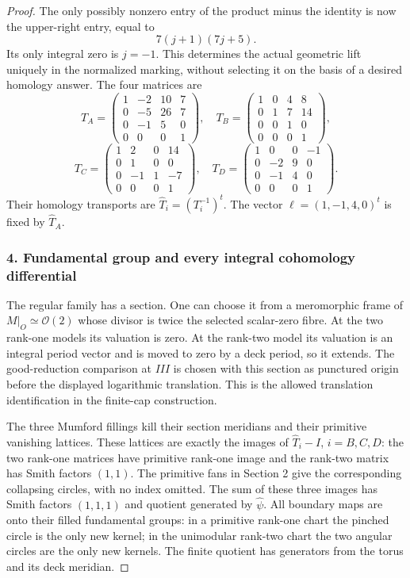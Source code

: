 \begin{proof}
The only possibly nonzero entry of the product minus the identity is now the upper-right entry, equal to \[
 7(j+1)(7j+5).
\] Its only integral zero is \(j=-1\). This determines the actual geometric lift uniquely in the normalized marking, without selecting it on the basis of a desired homology answer. The four matrices are \[
 T_A=\begin{pmatrix}1&-2&10&7\\0&-5&26&7\\0&-1&5&0\\0&0&0&1\end{pmatrix},\quad
 T_B=\begin{pmatrix}1&0&4&8\\0&1&7&14\\0&0&1&0\\0&0&0&1\end{pmatrix},
\] \[
 T_C=\begin{pmatrix}1&2&0&14\\0&1&0&0\\0&-1&1&-7\\0&0&0&1\end{pmatrix},\quad
 T_D=\begin{pmatrix}1&0&0&-1\\0&-2&9&0\\0&-1&4&0\\0&0&0&1\end{pmatrix}.
\] Their homology transports are \(\widehat T_i=(T_i^{-1})^t\). The vector \(\ell=(1,-1,4,0)^t\) is fixed by \(\widehat T_A\).

\subsubsection{4. Fundamental group and every integral cohomology differential}\label{fundamental-group-and-every-integral-cohomology-differential}

The regular family has a section. One can choose it from a meromorphic frame of \(M|_O\simeq\mathcal O(2)\) whose divisor is twice the selected scalar-zero fibre. At the two rank-one models its valuation is zero. At the rank-two model its valuation is an integral period vector and is moved to zero by a deck period, so it extends. The good-reduction comparison at \(III\) is chosen with this section as punctured origin before the displayed logarithmic translation. This is the allowed translation identification in the finite-cap construction.

The three Mumford fillings kill their section meridians and their primitive vanishing lattices. These lattices are exactly the images of \(\widehat T_i-I\), \(i=B,C,D\): the two rank-one matrices have primitive rank-one image and the rank-two matrix has Smith factors \((1,1)\). The primitive fans in Section 2 give the corresponding collapsing circles, with no index omitted. The sum of these three images has Smith factors \((1,1,1)\) and quotient generated by \(\widehat\psi\). All boundary maps are onto their filled fundamental groups: in a primitive rank-one chart the pinched circle is the only new kernel; in the unimodular rank-two chart the two angular circles are the only new kernels. The finite quotient has generators from the torus and its deck meridian.


\end{proof}
